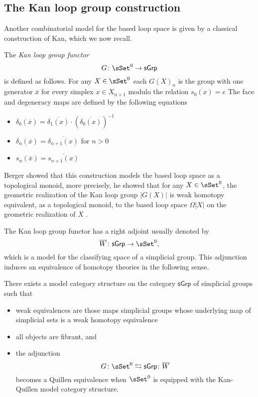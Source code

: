 \subsection{The Kan loop group construction} 
Another combinatorial model for the based loop space is given by a classical construction of Kan, which we now recall. 

The \textit{Kan loop group functor}  $$G\colon \sSet^0 \to \mathsf{sGrp}$$ is defined as follows. For any $X \in \sSet^0$ each $G(X)_n$ is the group with one generator $\overline{x}$ for every simplex $x \in X_{n+1}$ modulo the relation $\overline{s_0(x)}=e$ The face and degeneracy maps are defined by the following equations
\begin{itemize}
    \item $\delta_0(\overline{x}) = \overline{\delta_1(x)} \cdot (\overline{\delta_0(x)})^{-1}$
    \item $\delta_n(\overline{x})= \overline{\delta_{n+1}(x)}$ for $n >0$
    \item $s_n(\overline{x})= \overline{s_{n+1}(x)}$
\end{itemize}


Berger showed that this construction models the based loop space as a topological monoid, more precisely, he showed that for any $X \in \sSet^0$, the geometric realization of the Kan loop group $|G(X)|$ is weak homotopy equivalent, as a topological monoid, to the based loop space $\Omega|X|$ on the geometric realization of $X$ \cite{berger1995loops}. 


The Kan loop group functor has a right adjoint usually denoted by 
$$\overline{W} \colon \mathsf{sGrp} \to \sSet^0,$$ which is a model for the classifying space of a simplicial group. This adjunction induces an equivalence of homotopy theories in the following sense.

\begin{theorem} \label{kan} There exists a model category structure on the category $\mathsf{sGrp}$ of simplicial groups such that 
\begin{itemize}
    \item weak equivalences are those maps simplicial groups whose underlying map of simplicial sets is a weak homotopy equivalence
    \item all objects are fibrant, and
\item the adjunction
$$G \colon \sSet^0 \leftrightarrows \mathsf{sGrp}\colon \overline{W}$$
becomes a Quillen equivalence when $\sSet^0$ is equipped with the Kan-Quillen model category structure.
\end{itemize}
\end{theorem}

